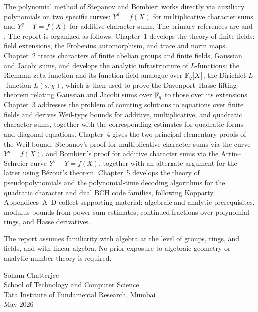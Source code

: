 The polynomial method of
Stepanov and Bombieri works directly via auxiliary polynomials on two specific curves:
$Y^d = f(X)$ for multiplicative character sums and $Y^q - Y = f(X)$ for additive character
sums. The primary references are \cite[Chapter~I-II]{Schmidt1976} and \cite[Chapter~2,5,6]{Lidl1996}.
The report is organized as follows. Chapter~1 develops the theory of finite fields: field extensions,
the Frobenius automorphism, and trace and norm maps. Chapter~2 treats characters of finite
abelian groups and finite fields, Gaussian and Jacobi sums, and develops the analytic infrastructure
of $L$-functions: the Riemann zeta function and its function-field analogue over $\mathbb{F}_q[X]$, the
Dirichlet $L$-function $L(s, \chi)$, which is then used to prove the Davenport--Hasse lifting theorem relating Gaussian
and Jacobi sums over $\mathbb{F}_q$ to those over its extensions. Chapter~3 addresses the problem of
counting solutions to equations over finite fields and derives Weil-type bounds for additive,
multiplicative, and quadratic character sums, together with the corresponding estimates for
quadratic forms and diagonal equations. Chapter~4 gives the two principal elementary proofs of
the Weil bound: Stepanov's proof for multiplicative character sums via the curve $Y^d = f(X)$,
and Bombieri's proof for additive character sums via the Artin--Schreier curve $Y^q - Y = f(X)$,
together with an alternate argument for the latter using B\'{e}zout's theorem. Chapter~5 develops
the theory of pseudopolynomials and the polynomial-time decoding algorithms for the quadratic
character and dual BCH code families, following Kopparty. Appendices~A--D collect supporting
material: algebraic and analytic prerequisites, modulus bounds from power sum estimates,
continued fractions over polynomial rings, and Hasse derivatives.

The report assumes familiarity with algebra at the level of groups, rings, and fields, and with linear
algebra. No prior exposure to algebraic geometry or analytic number theory is required.

\medskip
\begin{flushright}
Soham Chatterjee \\
School of Technology and Computer Science\\
Tata Institute of Fundamental Research, Mumbai \\
May 2026
\end{flushright}